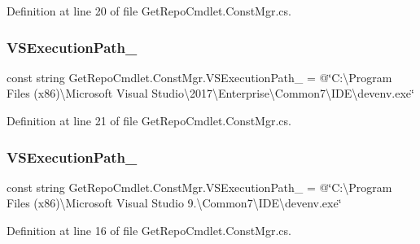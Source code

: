 Definition at line 20 of file Get\+Repo\+Cmdlet.\+Const\+Mgr.\+cs.

\mbox{\label{class_get_repo_cmdlet_1_1_const_mgr_aa4d550380f95a4ffd9ce96bc17c34dd8}} 
\subsubsection{\texorpdfstring{V\+S\+Execution\+Path\+\_}{VSExecutionPath\_15}}
{\footnotesize\ttfamily const string Get\+Repo\+Cmdlet.\+Const\+Mgr.\+V\+S\+Execution\+Path\+\_ = @\char`\"{}C\+:\textbackslash{}\+Program Files (x86)\textbackslash{}Microsoft Visual Studio\textbackslash{}2017\textbackslash{}\+Enterprise\textbackslash{}\+Common7\textbackslash{}\+I\+D\+E\textbackslash{}devenv.\+exe\char`\"{}\hspace{0.3cm}{\ttfamily [package]}}



Definition at line 21 of file Get\+Repo\+Cmdlet.\+Const\+Mgr.\+cs.

\mbox{\label{class_get_repo_cmdlet_1_1_const_mgr_adae487ce6c7ccaa6f217f3412af1b6ab}} 
\subsubsection{\texorpdfstring{V\+S\+Execution\+Path\+\_}{VSExecutionPath\_9}}
{\footnotesize\ttfamily const string Get\+Repo\+Cmdlet.\+Const\+Mgr.\+V\+S\+Execution\+Path\+\_ = @\char`\"{}C\+:\textbackslash{}\+Program Files (x86)\textbackslash{}Microsoft Visual Studio 9.\textbackslash{}Common7\textbackslash{}\+I\+D\+E\textbackslash{}devenv.\+exe\char`\"{}\hspace{0.3cm}{\ttfamily [package]}}



Definition at line 16 of file Get\+Repo\+Cmdlet.\+Const\+Mgr.\+cs.

